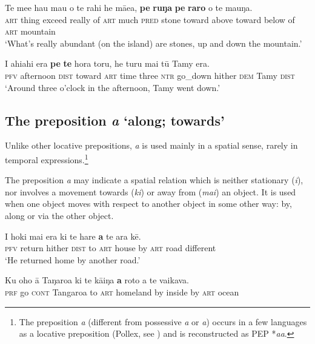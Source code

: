 \ea\label{ex:4.276}
\gll Te me{\ꞌ}e hau mau o te rahi he mā{\ꞌ}ea, \textbf{pe} \textbf{ruŋa} \textbf{pe} \textbf{raro} o te ma{\ꞌ}uŋa.\\
\textsc{art} thing exceed really of \textsc{art} much \textsc{pred} stone toward above toward below of \textsc{art} mountain\\

\glt 
‘What’s really abundant (on the island) are stones, up and down the mountain.’ \textstyleExampleref{[R350.011]} 
\z

\ea\label{ex:4.277}
\gll I ahiahi era \textbf{pe} \textbf{te} hora toru, he turu mai tū Tamy era.\\
\textsc{pfv} afternoon \textsc{dist} toward \textsc{art} time three \textsc{ntr} go\_down hither \textsc{dem} Tamy \textsc{dist}\\

\glt 
‘Around three o’clock in the afternoon, Tamy went down.’ \textstyleExampleref{[R315.273]} 
\z
{}
\subsection{The preposition \textit{a} ‘along; towards’}\label{sec:4.7.6}

Unlike other locative prepositions, \textit{a} is used mainly in a spatial sense, rarely in temporal expressions.\footnote{\label{fn:232}The preposition \textit{a} (different from possessive \textit{a} or \textit{{\ꞌ}a}) occurs in a few languages as a locative preposition (Pollex, see \citealt{GreenhillClark2011}) and is reconstructed as PEP *\textit{aa}.}  

The preposition \textit{a} may indicate a spatial relation which is neither stationary \mbox{(\textit{{\ꞌ}i}),} nor involves a movement towards (\textit{ki}) or away from (\textit{mai}) an object. It is used when one object moves with respect to another object in some other way: by, along or via the other object.

\ea\label{ex:4.278}
\gll I hoki mai era ki te hare \textbf{a} te ara kē. \\
\textsc{pfv} return hither \textsc{dist} to \textsc{art} house by \textsc{art} road different \\

\glt 
‘He returned home by another road.’ \textstyleExampleref{[R408.038]} 
\z

\ea\label{ex:4.279}
\gll Ku oho {\ꞌ}ā Taŋaroa ki te kāiŋa \textbf{a} roto a te vaikava. \\
\textsc{prf} go \textsc{cont} Tangaroa to \textsc{art} homeland by inside by \textsc{art} ocean \\

